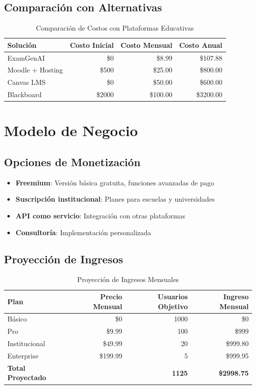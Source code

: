 \documentclass[12pt,a4paper]{report}
\begin{document}
\subsection{Comparación con Alternativas}
\begin{table}[h]
\centering
\begin{tabular}{|l|r|r|r|}
\hline
\textbf{Solución} & \textbf{Costo Inicial} & \textbf{Costo Mensual} & \textbf{Costo Anual} \\
\hline
ExamGenAI & \$0 & \$8.99 & \$107.88 \\
Moodle + Hosting & \$500 & \$25.00 & \$800.00 \\
Canvas LMS & \$0 & \$50.00 & \$600.00 \\
Blackboard & \$2000 & \$100.00 & \$3200.00 \\
\hline
\end{tabular}
\caption{Comparación de Costos con Plataformas Educativas}
\end{table}

\section{Modelo de Negocio}

\subsection{Opciones de Monetización}
\begin{itemize}
    \item \textbf{Freemium}: Versión básica gratuita, funciones avanzadas de pago
    \item \textbf{Suscripción institucional}: Planes para escuelas y universidades
    \item \textbf{API como servicio}: Integración con otras plataformas
    \item \textbf{Consultoría}: Implementación personalizada
\end{itemize}

\subsection{Proyección de Ingresos}
\begin{table}[h]
\centering
\begin{tabular}{|l|r|r|r|}
\hline
\textbf{Plan} & \textbf{Precio Mensual} & \textbf{Usuarios Objetivo} & \textbf{Ingreso Mensual} \\
\hline
Básico & \$0 & 1000 & \$0 \\
Pro & \$9.99 & 100 & \$999 \\
Institucional & \$49.99 & 20 & \$999.80 \\
Enterprise & \$199.99 & 5 & \$999.95 \\
\hline
\textbf{Total Proyectado} & & \textbf{1125} & \textbf{\$2998.75} \\
\hline
\end{tabular}
\caption{Proyección de Ingresos Mensuales}
\end{table}
\end{document}
